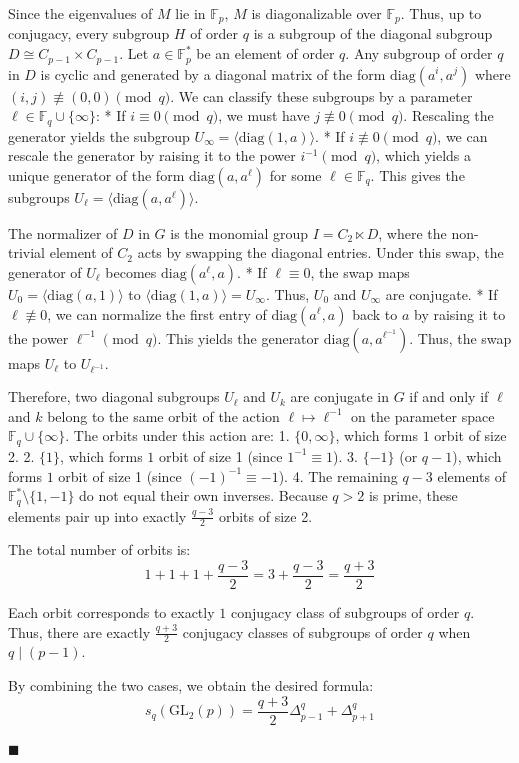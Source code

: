 Since the eigenvalues of $M$ lie in $\mathbb{F}_p$, $M$ is diagonalizable over $\mathbb{F}_p$. Thus, up to conjugacy, every subgroup $H$ of order $q$ is a subgroup of the diagonal subgroup $D \cong C_{p-1} \times C_{p-1}$. Let $a \in \mathbb{F}_p^*$ be an element of order $q$. Any subgroup of order $q$ in $D$ is cyclic and generated by a diagonal matrix of the form $\text{diag}(a^i, a^j)$ where $(i, j) \not\equiv (0, 0) \pmod q$. We can classify these subgroups by a parameter $\ell \in \mathbb{F}_q \cup \{\infty\}$:
* If $i \equiv 0 \pmod q$, we must have $j \not\equiv 0 \pmod q$. Rescaling the generator yields the subgroup $U_{\infty} = \langle \text{diag}(1, a) \rangle$.
* If $i \not\equiv 0 \pmod q$, we can rescale the generator by raising it to the power $i^{-1} \pmod q$, which yields a unique generator of the form $\text{diag}(a, a^{\ell})$ for some $\ell \in \mathbb{F}_q$. This gives the subgroups $U_{\ell} = \langle \text{diag}(a, a^{\ell}) \rangle$.

The normalizer of $D$ in $G$ is the monomial group $I = C_2 \ltimes D$, where the non-trivial element of $C_2$ acts by swapping the diagonal entries. Under this swap, the generator of $U_{\ell}$ becomes $\text{diag}(a^{\ell}, a)$.
* If $\ell \equiv 0$, the swap maps $U_0 = \langle \text{diag}(a, 1) \rangle$ to $\langle \text{diag}(1, a) \rangle = U_{\infty}$. Thus, $U_0$ and $U_{\infty}$ are conjugate.
* If $\ell \not\equiv 0$, we can normalize the first entry of $\text{diag}(a^{\ell}, a)$ back to $a$ by raising it to the power $\ell^{-1} \pmod q$. This yields the generator $\text{diag}(a, a^{\ell^{-1}})$. Thus, the swap maps $U_{\ell}$ to $U_{\ell^{-1}}$.

Therefore, two diagonal subgroups $U_{\ell}$ and $U_k$ are conjugate in $G$ if and only if $\ell$ and $k$ belong to the same orbit of the action $\ell \mapsto \ell^{-1}$ on the parameter space $\mathbb{F}_q \cup \{\infty\}$. The orbits under this action are:
1. $\{0, \infty\}$, which forms $1$ orbit of size 2.
2. $\{1\}$, which forms $1$ orbit of size 1 (since $1^{-1} \equiv 1$).
3. $\{-1\}$ (or $q-1$), which forms $1$ orbit of size 1 (since $(-1)^{-1} \equiv -1$).
4. The remaining $q-3$ elements of $\mathbb{F}_q^* \setminus \{1, -1\}$ do not equal their own inverses. Because $q > 2$ is prime, these elements pair up into exactly $\frac{q-3}{2}$ orbits of size 2.

The total number of orbits is:
$$1 + 1 + 1 + \frac{q-3}{2} = 3 + \frac{q-3}{2} = \frac{q+3}{2}$$

Each orbit corresponds to exactly $1$ conjugacy class of subgroups of order $q$. Thus, there are exactly $\frac{q+3}{2}$ conjugacy classes of subgroups of order $q$ when $q \mid (p-1)$. 

By combining the two cases, we obtain the desired formula:
$$s_q(\text{GL}_2(p)) = \frac{q+3}{2}\Delta^q_{p-1} + \Delta^q_{p+1}$$

$\blacksquare$